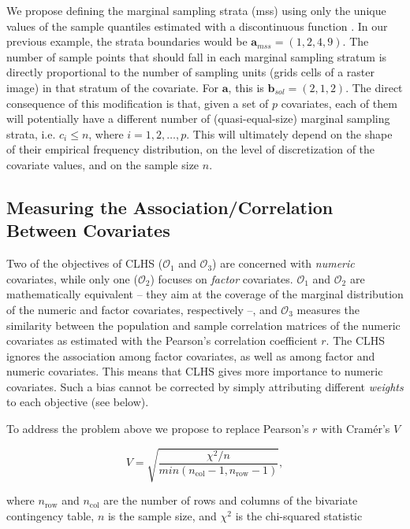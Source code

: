 We propose defining the marginal sampling strata (mss) using only the unique values of the sample quantiles 
estimated with a discontinuous function \cite{HyndmanEtAl1996}. In our previous example, the strata boundaries 
would be $\boldsymbol{a}_{mss} = (1, 2, 4, 9)$. The number of sample points that should fall in each marginal 
sampling stratum is directly proportional to the number of sampling units (grids cells of a raster image) in 
that stratum of the covariate. For $\boldsymbol{a}$, this is $\boldsymbol{b}_{sol} = (2, 1, 2)$. The direct 
consequence of this modification is that, given a set of $p$ covariates, each of them will potentially have a 
different number of (quasi-equal-size) marginal sampling strata, i.e. $c_i \leq n$, where $i = 1, 2, \ldots, 
p$. This will ultimately depend on the shape of their empirical frequency distribution, on the level of 
discretization of the covariate values, and on the sample size $n$.

\subsection{Measuring the Association/Correlation Between Covariates}

Two of the objectives of CLHS ($\mathcal{O}_1$ and $\mathcal{O}_3$) are concerned with \emph{numeric} 
covariates, while only one ($\mathcal{O}_2$) focuses on \emph{factor} covariates. $\mathcal{O}_1$ and 
$\mathcal{O}_2$ are mathematically equivalent -- they aim at the coverage of the marginal distribution of the 
numeric and factor covariates, respectively --, and $\mathcal{O}_3$ measures the similarity between the 
population and sample correlation matrices of the numeric covariates as estimated with the Pearson's 
correlation coefficient $r$. The CLHS ignores the association among factor covariates, as well as among factor 
and numeric covariates. This means that CLHS gives more importance to numeric covariates. Such a bias cannot be 
corrected by simply attributing different \emph{weights} to each objective (see below).

To address the problem above we propose to replace Pearson's $r$ with Cramér's $V$

\begin{equation}\label{eqn:chap08-cramer} %
 V =  \sqrt{\frac{\chi^2 / n}{min(n_\text{col} - 1, n_\text{row} - 1)}},
\end{equation}

\noindent where $n_\text{row}$ and $n_\text{col}$ are the number of rows and columns of the bivariate 
contingency table, $n$ is the sample size, and $\chi^2$ is the chi-squared statistic


